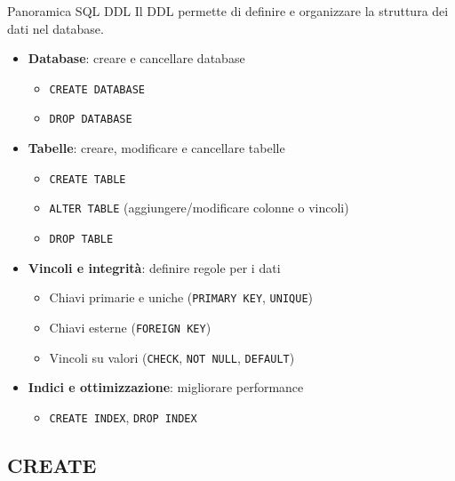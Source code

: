 \documentclass{beamer}
\begin{document}
\begin{frame}{Panoramica SQL DDL}
Il DDL permette di definire e organizzare la struttura dei dati nel database.
\medskip

\begin{itemize}
    \item \textbf{Database}: creare e cancellare database
        \begin{itemize}
            \item \texttt{CREATE DATABASE}
            \item \texttt{DROP DATABASE}
        \end{itemize}

    \item \textbf{Tabelle}: creare, modificare e cancellare tabelle
        \begin{itemize}
            \item \texttt{CREATE TABLE}
            \item \texttt{ALTER TABLE} (aggiungere/modificare colonne o vincoli)
            \item \texttt{DROP TABLE}
        \end{itemize}

    \item \textbf{Vincoli e integrità}: definire regole per i dati
        \begin{itemize}
            \item Chiavi primarie e uniche (\texttt{PRIMARY KEY}, \texttt{UNIQUE})
            \item Chiavi esterne (\texttt{FOREIGN KEY})
            \item Vincoli su valori (\texttt{CHECK}, \texttt{NOT NULL}, \texttt{DEFAULT})
        \end{itemize}

    \item \textbf{Indici e ottimizzazione}: migliorare performance
        \begin{itemize}
            \item \texttt{CREATE INDEX}, \texttt{DROP INDEX}
        \end{itemize}
\end{itemize}
\end{frame}

\subsection{CREATE}
\end{document}
